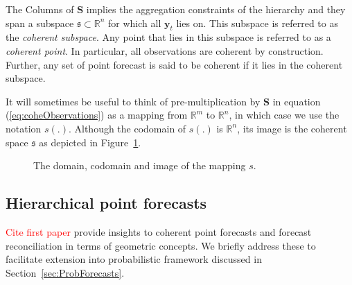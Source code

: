 \documentclass[12pt]{article}
\theoremstyle{definition}
\begin{document}
The Columns of $\bm{S}$ implies the aggregation constraints of the hierarchy and they span a subspace $\mathfrak{s} \subset \mathbb{R}^n$ for which all $\bm{y}_t$ lies on. This subspace is referred to as the \emph{coherent subspace}. Any point that lies in this subspace is referred to as a \emph{coherent point}. In particular, all observations are coherent by construction. Further, any set of point forecast is said to be coherent if it lies in the coherent subspace. 

It will sometimes be useful to think of pre-multiplication by $\bm{S}$ in equation (\ref{eq:coheObservations}) as a mapping from $\mathbb{R}^m$ to $\mathbb{R}^n$, in which case we use the notation $s(.)$. Although the codomain of $s(.)$ is $\mathbb{R}^n$, its image is the coherent space $\mathfrak{s}$ as depicted in Figure~\ref{fig2}.

\begin{figure}[H]
	\begin{center}
	\end{center}
	\caption{The domain, codomain and image of the mapping $s$.}\label{fig2}
\end{figure}

\subsection{Hierarchical point forecasts}\label{subsec:preliminary}

\textcolor{red}{Cite first paper} provide insights to coherent point forecasts and forecast reconciliation in terms of geometric concepts. We briefly address these to facilitate extension into probabilistic framework discussed in Section~\ref{sec:ProbForecasts}.   
\end{document}
